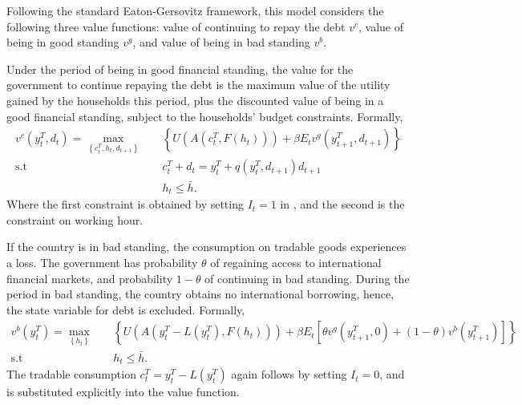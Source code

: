 Following the standard Eaton-Gersovitz framework, this model considers the following three value functions:
value of continuing to repay the debt $v^c$, value of being in good standing $v^g$, and value of being in bad standing $v^b$.

Under the period of being in good financial standing, the value for the government to continue repaying the debt is the maximum value of the utility gained by the households this period, plus the discounted value of being in a good financial standing, subject to the households' budget constraints. Formally,
\begin{equation}
    \label{eq:vc}
    \begin{aligned}
        v^c(y^T_t, d_t) = \max_{\left\{ c^T_t, h_t, d_{t+1} \right\}} \quad
        &\left\{
            U\left(
                A\left(c^T_t, F(h_t)\right)
             \right)
             + \beta E_t
             v^g \left(
                y^T_{t+1}, d_{t+1}
              \right)
         \right\}\\
          \text{s.t} \quad& c^T_t + d_t = y^T_t + q(y^T_t, d_{t+1}) d_{t+1} \\
                    & h_t \le \bar{h}.
    \end{aligned}
\end{equation}
Where the first constraint is obtained by setting $I_t = 1$ in , and the second is the constraint on working hour.

If the country is in bad standing, the consumption on tradable goods experiences a loss. The government has probability $\theta$ of regaining access to international financial markets, and probability $1 - \theta$ of continuing in bad standing. During the period in bad standing, the country obtains no international borrowing, hence, the state variable for debt is excluded. Formally,
\begin{equation}
    \label{eq:vb}
    \begin{aligned}
        v^b(y^T_t) = \max_{\left\{ h_t \right\}} \quad
        &\left\{
            U\left(
                A\left( y^T_t - L(y^T_t), F(h_t)\right)
             \right)
             + \beta E_t \left[
                \theta v^g \left(
                    y^T_{t+1}, 0
                \right)
                + (1-\theta) v^b \left(
                    y^{T}_{t+1}
                 \right)
            \right]
         \right\}\\
          \text{s.t} \quad& h_t \le \bar{h}.
    \end{aligned}
\end{equation}
The tradable consumption $c^T_t = y^T_t - L(y^T_t)$ again follows  by setting $I_t = 0$, and is substituted explicitly into the value function.

